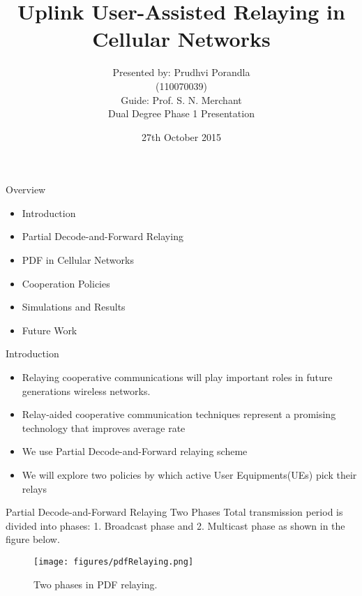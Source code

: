 \documentclass{beamer}
\title{Uplink User-Assisted Relaying in Cellular Networks}
\author{Presented by: Prudhvi Porandla \\ \quad (110070039)\\
\vspace{2mm}
Guide: Prof. S. N. Merchant \\
\vspace{2mm}
Dual Degree Phase 1 Presentation}
\date{27th October 2015}
\begin{document}
\begin{frame}
  \titlepage
\end{frame}

\begin{frame}{Overview}
  \begin{itemize}
  \item Introduction
  \vspace{3mm}
  \item  Partial Decode-and-Forward Relaying
  \vspace{3mm}
  \item PDF in Cellular Networks
  \vspace{3mm}
  \item Cooperation Policies 
  \vspace{3mm}
  \item Simulations and Results
  \vspace{3mm}
  \item Future Work
  \end{itemize}
\end{frame}




\begin{frame}{Introduction}
  \begin{itemize}
  \item Relaying cooperative communications will play important roles in future generations wireless networks.
  \vspace{0.5cm}
  \item Relay-aided cooperative communication techniques represent a promising technology that improves average rate
  \vspace{0.5cm}
  \item We use Partial Decode-and-Forward relaying scheme 
  \vspace{0.5cm}
  \item We will explore two policies by which active User Equipments(UEs) pick their relays
  \end{itemize}
\end{frame}

\begin{frame}{Partial Decode-and-Forward Relaying} {Two Phases}
Total transmission period is divided into phases: 1. Broadcast phase and 2. Multicast phase as shown in the figure below.
\begin{figure}
\centering
\texttt{[image: figures/pdfRelaying.png]}
  \caption{Two phases in PDF relaying.}
\end{figure}
\end{frame}
\end{document}
